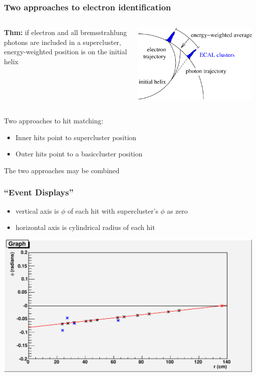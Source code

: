 \documentclass[12pt,compress]{beamer}
\begin{document}
\begin{frame}
\frametitle{Two approaches to electron identification}

\begin{columns}

{\bf Thm:} if electron and all bremsstrahlung photons are included
in a supercluster, energy-weighted position is on the initial helix

\includegraphics[width=\linewidth]{theorem}

\end{columns}

\vfill
Two approaches to hit matching:
\begin{itemize}
\item Inner hits point to supercluster position
\item Outer hits point to a basiccluster position
\end{itemize}

The two approaches may be combined
\end{frame}

\begin{frame}
\frametitle{``Event Displays''}

\begin{itemize}
\item vertical axis is $\phi$ of each hit with supercluster's $\phi$ as zero
\item horizontal axis is cylindrical radius of each hit
\end{itemize}

\begin{center}
\includegraphics[width=0.85\linewidth]{event_display}
\end{center}

\end{frame}
\end{document}
